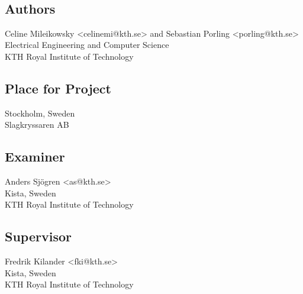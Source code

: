 ~\\
\vfill
{ 
	\subsection*{Authors}
	Celine Mileikowsky <celinemi@kth.se> and Sebastian Porling <porling@kth.se>\\
	Electrical Engineering and Computer Science\\
	KTH Royal Institute of Technology
	
	\subsection*{Place for Project}
	Stockholm, Sweden\\
	Slagkryssaren AB
	
	\subsection*{Examiner}
	Anders Sjögren <as@kth.se> \\
	Kista, Sweden\\
	KTH Royal Institute of Technology
	
	\subsection*{Supervisor }
	Fredrik Kilander <fki@kth.se>\\
	Kista, Sweden\\
	KTH Royal Institute of Technology
	~
	
}


